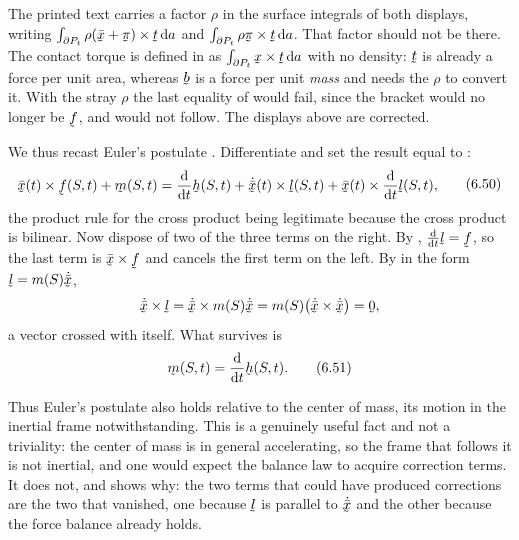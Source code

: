 \begin{remark}\label{rem:ch6misprint48}
The printed text carries a factor $\rho$ in the surface integrals of
both displays, writing $\int_{\partial P_{t}}\rho(\bar{\bx}+\vek\pi)
\times\bt\,\dl a$ and $\int_{\partial P_{t}}\rho\vek\pi\times\bt\,\dl
a$. That factor should not be there. The contact torque is defined in
 as $\int_{\partial P_{t}}\bx\times\bt\,\dl a$ with no
density: $\bt$ is already a force per unit area, whereas $\bb$ is a
force per unit \emph{mass} and needs the $\rho$ to convert it. With the
stray $\rho$ the last equality of  would fail, since the
bracket would no longer be $\vek{f}$, and  would not follow.
The displays above are corrected.
\end{remark}

We thus recast Euler's postulate . Differentiate 
and set the result equal to :
\begin{equation}
\begin{aligned}
   \bar{\bx}(t)\times\vek{f}(S,t)+\bm(S,t)
   =\frac{\dl}{\dl t}\bh(S,t)
    +\dot{\bar{\bx}}(t)\times\vek{l}(S,t)
    +\bar{\bx}(t)\times\frac{\dl}{\dl t}\vek{l}(S,t),
\end{aligned}
   \tag{6.50}\label{eq:6.50}
\end{equation}
the product rule for the cross product being legitimate because the
cross product is bilinear. Now dispose of two of the three terms on the
right. By , $\frac{\dl}{\dl t}\vek{l}=\vek{f}$, so the last
term is $\bar{\bx}\times\vek{f}$ and cancels the first term on the
left. By  in the form $\vek{l}=m(S)\dot{\bar{\bx}}$,
\[
   \dot{\bar{\bx}}\times\vek{l}
   =\dot{\bar{\bx}}\times m(S)\dot{\bar{\bx}}
   =m(S)\big(\dot{\bar{\bx}}\times\dot{\bar{\bx}}\big)=\bze ,
\]
a vector crossed with itself. What survives is
\begin{equation}
   \bm(S,t)=\frac{\dl}{\dl t}\bh(S,t).
   \tag{6.51}\label{eq:6.51}
\end{equation}

Thus Euler's postulate also holds relative to the center of mass, its
motion in the inertial frame notwithstanding. This is a genuinely
useful fact and not a triviality: the center of mass is in general
accelerating, so the frame that follows it is not inertial, and one
would expect the balance law to acquire correction terms. It does not,
and  shows why: the two terms that could have produced
corrections are the two that vanished, one because $\vek{l}$ is
parallel to $\dot{\bar{\bx}}$ and the other because the force balance
 already holds.

